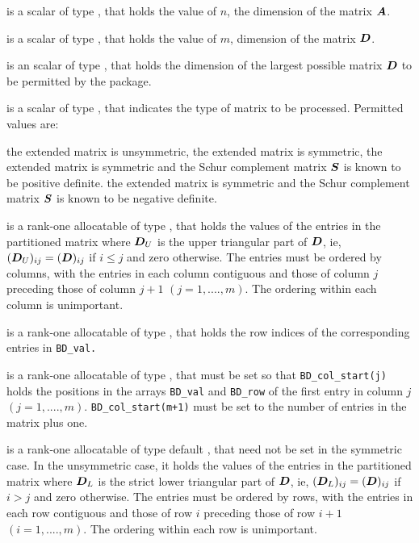 \documentclass{galahad}
\begin{document}
\begin{description}

 is a scalar of type \integer, that holds the value of 
$n$, the dimension of the matrix $ {\bm{A}}$. 
 
 is a scalar of type \integer, that holds the value of  
$m$, dimension of the matrix ${\bm{D}}$. 
 
 is an scalar of type \integer,
that holds the dimension of the largest possible matrix ${\bm{D}}$ to be permitted
by the package. 

 is a scalar of type \integer,
that indicates the type of matrix to be processed. Permitted values are: 

\begin{description} 
 the extended matrix is unsymmetric, 
 the extended matrix is symmetric, 
 the extended matrix is symmetric and the Schur complement matrix 
${\bm{S}}$ is known to be positive definite. 
 the extended matrix is symmetric and the Schur complement matrix 
${\bm{S}}$ is known to be negative definite. 
\end{description} 

 is a rank-one allocatable of  
type \realdp, 
that holds the values of the entries in the partitioned matrix 
where ${\bm{D}}_U$ is the upper triangular part of ${\bm{D}}$, ie, 
$( {\bm{D}}_U )_{ij}  =  ( {\bm{D}} )_{ij} $ if $i  \leq  j$ and zero otherwise. 
The entries must be ordered by columns, with the entries in each column 
contiguous and those of column 
$j$ preceding those of column $j+1$ $(j = 1, ...., m)$. The ordering 
within each column is unimportant. 
 
 is a rank-one allocatable of type \integer, that holds 
the row indices of the corresponding entries in {\tt BD\_val.} 
 
 is a rank-one allocatable of type \integer, that  
must be set so that {\tt BD\_col\_start(j)} holds the positions 
in the arrays {\tt BD\_val} and {\tt BD\_row} of the first entry in column $j$ 
$(j = 1, ...., m)$. {\tt BD\_col\_start(m+1)} must be set to 
the number of entries in the matrix  plus one. 
 
 is a rank-one allocatable of type default  
\realdp, that need not be 
set in the symmetric case. In the unsymmetric case, it 
holds the values of the entries in the partitioned matrix 
where ${\bm{D}}_L$ is the strict lower triangular part of ${\bm{D}}$, ie, 
$( {\bm{D}}_L )_{ij}  =  ( {\bm{D}} )_{ij} $ if $i  >  j$ and zero 
otherwise. 
The entries must be ordered by rows, with the entries in each row 
contiguous and those of row 
$i$ preceding those of row $i+1$ $(i = 1, ...., m)$. 
The ordering within each row is unimportant. 
 

\end{description}
\end{document}
